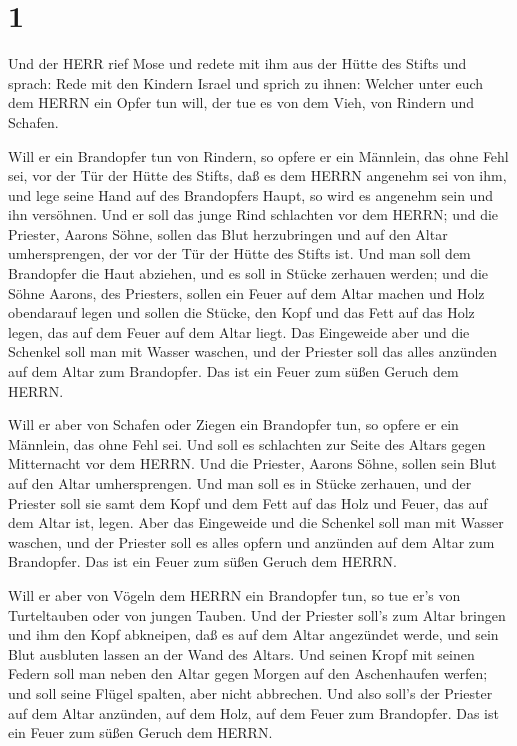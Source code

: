 \hypertarget{section}{%
\section{1}\label{section}}

 Und der HERR rief Mose und redete mit ihm aus der Hütte des
Stifts und sprach:  Rede mit den Kindern Israel und sprich
zu ihnen: Welcher unter euch dem HERRN ein Opfer tun will, der tue es
von dem Vieh, von Rindern und Schafen.

 Will er ein Brandopfer tun von Rindern, so opfere er ein
Männlein, das ohne Fehl sei, vor der Tür der Hütte des Stifts, daß es
dem HERRN angenehm sei von ihm,  und lege seine Hand auf des
Brandopfers Haupt, so wird es angenehm sein und ihn versöhnen.
 Und er soll das junge Rind schlachten vor dem HERRN; und
die Priester, Aarons Söhne, sollen das Blut herzubringen und auf den
Altar umhersprengen, der vor der Tür der Hütte des Stifts ist.
 Und man soll dem Brandopfer die Haut abziehen, und es soll
in Stücke zerhauen werden;  und die Söhne Aarons, des
Priesters, sollen ein Feuer auf dem Altar machen und Holz obendarauf
legen  und sollen die Stücke, den Kopf und das Fett auf das
Holz legen, das auf dem Feuer auf dem Altar liegt.  Das
Eingeweide aber und die Schenkel soll man mit Wasser waschen, und der
Priester soll das alles anzünden auf dem Altar zum Brandopfer. Das ist
ein Feuer zum süßen Geruch dem HERRN.

 Will er aber von Schafen oder Ziegen ein Brandopfer tun,
so opfere er ein Männlein, das ohne Fehl sei.  Und soll es
schlachten zur Seite des Altars gegen Mitternacht vor dem HERRN. Und die
Priester, Aarons Söhne, sollen sein Blut auf den Altar umhersprengen.
 Und man soll es in Stücke zerhauen, und der Priester soll
sie samt dem Kopf und dem Fett auf das Holz und Feuer, das auf dem Altar
ist, legen.  Aber das Eingeweide und die Schenkel soll man
mit Wasser waschen, und der Priester soll es alles opfern und anzünden
auf dem Altar zum Brandopfer. Das ist ein Feuer zum süßen Geruch dem
HERRN.

 Will er aber von Vögeln dem HERRN ein Brandopfer tun, so
tue er's von Turteltauben oder von jungen Tauben.  Und der
Priester soll's zum Altar bringen und ihm den Kopf abkneipen, daß es auf
dem Altar angezündet werde, und sein Blut ausbluten lassen an der Wand
des Altars.  Und seinen Kropf mit seinen Federn soll man
neben den Altar gegen Morgen auf den Aschenhaufen werfen; 
und soll seine Flügel spalten, aber nicht abbrechen. Und also soll's der
Priester auf dem Altar anzünden, auf dem Holz, auf dem Feuer zum
Brandopfer. Das ist ein Feuer zum süßen Geruch dem HERRN.

